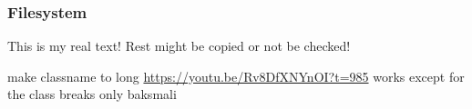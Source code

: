 \subsubsection{Filesystem} \label{subsubsection:counter-reengineering-break-filesystem}
This is my real text! Rest might be copied or not be checked!


make classname to long\newline
\url{https://youtu.be/Rv8DfXNYnOI?t=985} works except for the class\newline
breaks only baksmali
